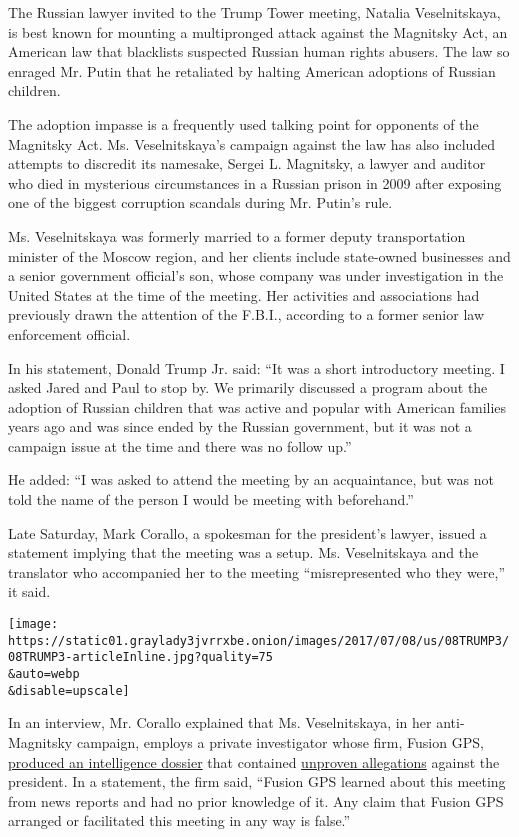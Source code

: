 The Russian lawyer invited to the Trump Tower meeting, Natalia
Veselnitskaya, is best known for mounting a multipronged attack against
the Magnitsky Act, an American law that blacklists suspected Russian
human rights abusers. The law so enraged Mr. Putin that he retaliated by
halting American adoptions of Russian children.

The adoption impasse is a frequently used talking point for opponents of
the Magnitsky Act. Ms. Veselnitskaya's campaign against the law has also
included attempts to discredit its namesake, Sergei L. Magnitsky, a
lawyer and auditor who died in mysterious circumstances in a Russian
prison in 2009 after exposing one of the biggest corruption scandals
during Mr. Putin's rule.

Ms. Veselnitskaya was formerly married to a former deputy transportation
minister of the Moscow region, and her clients include state-owned
businesses and a senior government official's son, whose company was
under investigation in the United States at the time of the meeting. Her
activities and associations had previously drawn the attention of the
F.B.I., according to a former senior law enforcement official.

In his statement, Donald Trump Jr. said: ``It was a short introductory
meeting. I asked Jared and Paul to stop by. We primarily discussed a
program about the adoption of Russian children that was active and
popular with American families years ago and was since ended by the
Russian government, but it was not a campaign issue at the time and
there was no follow up.''

He added: ``I was asked to attend the meeting by an acquaintance, but
was not told the name of the person I would be meeting with
beforehand.''

Late Saturday, Mark Corallo, a spokesman for the president's lawyer,
issued a statement implying that the meeting was a setup. Ms.
Veselnitskaya and the translator who accompanied her to the meeting
``misrepresented who they were,'' it said.

\texttt{[image: https://static01.graylady3jvrrxbe.onion/images/2017/07/08/us/08TRUMP3/08TRUMP3-articleInline.jpg?quality=75\\\&auto=webp\\\&disable=upscale]}

In an interview, Mr. Corallo explained that Ms. Veselnitskaya, in her
anti-Magnitsky campaign, employs a private investigator whose firm,
Fusion GPS,
\href{https://www.nytimes3xbfgragh.onion/2017/01/11/us/politics/donald-trump-russia-intelligence.html}{produced
an intelligence dossier} that contained
\href{https://www.nytimes3xbfgragh.onion/2017/01/11/us/politics/trump-intelligence-report-explainer.html}{unproven
allegations} against the president. In a statement, the firm said,
``Fusion GPS learned about this meeting from news reports and had no
prior knowledge of it. Any claim that Fusion GPS arranged or facilitated
this meeting in any way is false.''

